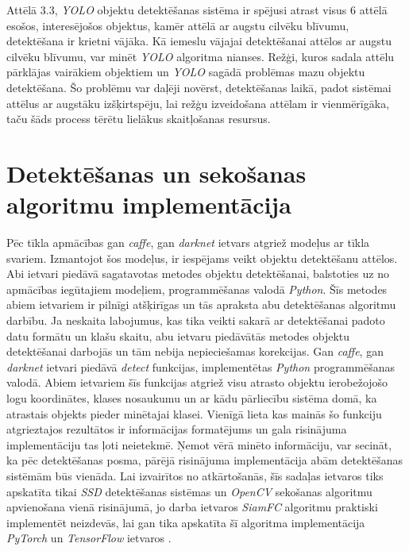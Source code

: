 Attēlā 3.3, \textit{YOLO} objektu detektēšanas sistēma ir spējusi atrast visus 6 attēlā esošos, interesējošos objektus, kamēr attēlā ar augstu cilvēku blīvumu, detektēšana ir krietni vājāka. Kā iemeslu vājajai detektēšanai attēlos ar augstu cilvēku blīvumu, var minēt \textit{YOLO} algoritma nianses. Režģi, kuros sadala attēlu pārklājas vairākiem objektiem un \textit{YOLO} sagādā problēmas mazu objektu detektēšana. Šo problēmu var daļēji novērst, detektēšanas laikā, padot sistēmai attēlus ar augstāku izšķirtspēju, lai režģu izveidošana attēlam ir vienmērīgāka, taču šāds process tērētu lielākus skaitļošanas resursus. 
\section{Detektēšanas un sekošanas algoritmu implementācija}
Pēc tīkla apmācības gan \textit{caffe}, gan \textit{darknet} ietvars atgriež modeļus ar tīkla svariem. Izmantojot šos modeļus, ir iespējams veikt objektu detektēšanu attēlos. Abi ietvari piedāvā sagatavotas metodes objektu detektēšanai, balstoties uz no apmācības iegūtajiem modeļiem, programmēšanas valodā \textit{Python}. Šīs metodes abiem ietvariem ir pilnīgi atšķirīgas un tās apraksta abu detektēšanas algoritmu darbību. Ja neskaita labojumus, kas tika veikti sakarā ar detektēšanai padoto datu formātu un klašu skaitu, abu ietvaru piedāvātās metodes objektu detektēšanai darbojās un tām nebija nepieciešamas korekcijas. Gan \textit{caffe}, gan \textit{darknet} ietvari piedāvā \textit{detect} funkcijas, implementētas \textit{Python} programmēšanas valodā. Abiem ietvariem šīs funkcijas atgriež visu atrasto objektu ierobežojošo logu koordinātes, klases nosaukumu un ar kādu pārliecību sistēma domā, ka atrastais objekts pieder minētajai klasei. Vienīgā lieta kas mainās šo funkciju atgrieztajos rezultātos ir informācijas formatējums un gala risinājuma implementāciju tas ļoti neietekmē. Ņemot vērā minēto informāciju, var secināt, ka pēc detektēšanas posma, pārējā risinājuma implementācija abām detektēšanas sistēmām būs vienāda. Lai izvairītos no atkārtošanās, šīs sadaļas ietvaros tiks apskatīta tikai \textit{SSD} detektēšanas sistēmas un \textit{OpenCV} sekošanas algoritmu apvienošana vienā risinājumā, jo darba ietvaros \textit{SiamFC} algoritmu praktiski implementēt neizdevās, lai gan tika apskatīta šī algoritma implementācija \textit{PyTorch} un \textit{TensorFlow} ietvaros \cite{siamfcrepo1,siamfcrepo2}. 
